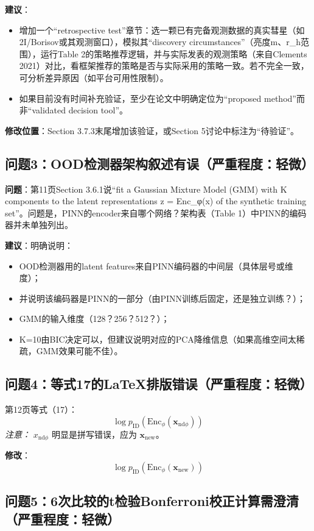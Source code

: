 \documentclass[12pt]{article}
\begin{document}
\textbf{建议}：
\begin{itemize}
    \item 增加一个“retrospective test”章节：选一颗已有完备观测数据的真实彗星（如2I/Borisov或其观测窗口），模拟其“discovery circumstances”（亮度m、r\_h范围），运行Table 2的策略推荐逻辑，并与实际发表的观测策略（来自Clements 2021）对比，看框架推荐的策略是否与实际采用的策略一致。若不完全一致，可分析差异原因（如平台可用性限制）。
    \item 如果目前没有时间补充验证，至少在论文中明确定位为“proposed method”而非“validated decision tool”。
\end{itemize}
\textbf{修改位置}：Section 3.7.3末尾增加该验证，或Section 5讨论中标注为“待验证”。

\subsection{问题3：OOD检测器架构叙述有误（严重程度：轻微）}

\textbf{问题}：第11页Section 3.6.1说“fit a Gaussian Mixture Model (GMM) with K components to the latent representations z = Enc\_φ(x) of the synthetic training set”。问题是，PINN的encoder来自哪个网络？架构表（Table 1）中PINN的编码器并未单独列出。

\textbf{建议}：明确说明：
\begin{itemize}
    \item OOD检测器用的latent features来自PINN编码器的中间层（具体层号或维度）；
    \item 并说明该编码器是PINN的一部分（由PINN训练后固定，还是独立训练？）；
    \item GMM的输入维度（128？256？512？）；
    \item K=10由BIC决定可以，但建议说明对应的PCA降维信息（如果高维空间太稀疏，GMM效果可能不佳）。
\end{itemize}

\subsection{问题4：等式17的LaTeX排版错误（严重程度：轻微）}

第12页等式（17）：
\[
\log p_{\mathrm{ID}}(\mathrm{Enc}_{\phi}(\mathbf{x}_{\mathrm{nd}\phi}))
\]
\textit{注意：} \(x_{\mathrm{nd}\phi}\) 明显是拼写错误，应为 \(\mathbf{x}_{\mathrm{new}}\)。

\textbf{修改}：
\[
\log p_{\mathrm{ID}}(\mathrm{Enc}_{\phi}(\mathbf{x}_{\mathrm{new}}))
\]

\subsection{问题5：6次比较的t检验Bonferroni校正计算需澄清（严重程度：轻微）}
\end{document}

